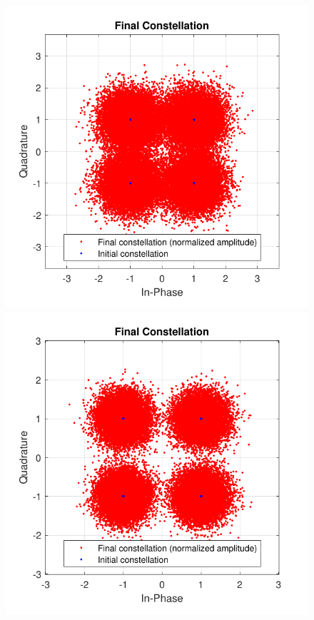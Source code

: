 \begin{figure}[h]
	\centering
	\begin{minipage}{0.33\textwidth}
		\centering
		\includegraphics[width=1\textwidth]{sdf/m_qam_system/figures/simulations/04_incLO/constNorm_lo0dBm.pdf}
	\end{minipage}
	\begin{minipage}{0.33\textwidth}
		\centering
		\includegraphics[width=1\textwidth]{sdf/m_qam_system/figures/simulations/04_incLO/constNorm_lo3dBm.pdf}

\end{minipage}
\end{figure}
